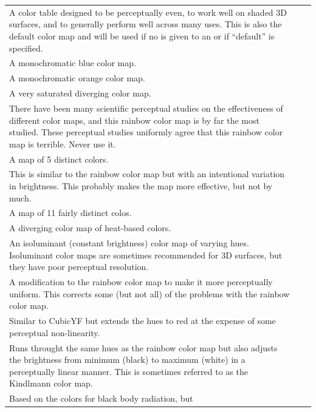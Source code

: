\begin{longtabu} to \textwidth {llX}
   A color table designed to be perceptually even, to
  work well on shaded 3D surfaces, and to generally perform well across
  many uses. This is also the default color map and will be used if no
   is given to an  or if
  ``default'' is specified. %
   \\
   A monochromatic blue color map. \\
   A monochromatic orange color map. \\
   A very saturated diverging color map. \\
   There have been many scientific perceptual studies on
  the effectiveness of different color maps, and this rainbow color map is
  by far the most studied. These perceptual studies uniformly agree that
  this rainbow color map is terrible. Never use it.\\
   A map of 5 distinct colors. \\
   This is similar to the rainbow color map but with an
  intentional variation in brightness. This probably makes the map more
  effective, but not by much. \\
   A map of 11 fairly distinct colos. \\
   A diverging color map of heat-based colors. \\
   An isoluminant (constant brightness) color map of
  varying hues. Isoluminant color maps are sometimes recommended for 3D
  surfaces, but they have poor perceptual resolution. \\
   A modification to the rainbow color map to make it
  more perceptually uniform. This corrects some (but not all) of the
  problems with the rainbow color map. \\
   Similar to CubicYF but extends the hues to red at the
  expense of some perceptual non-linearity. \\
   Runs throught the same hues as the rainbow color map
  but also adjusts the brightness from minimum (black) to maximum (white)
  in a perceptually linear manner. This is sometimes referred to as the
  Kindlmann color map. \\
   Based on the colors for black body radiation, but

\end{longtabu}
